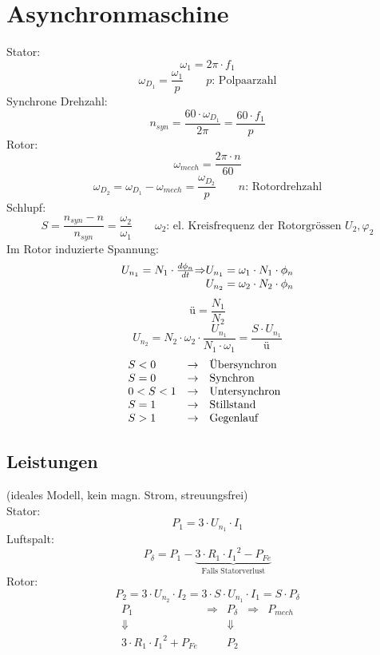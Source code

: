 \section{Asynchronmaschine}
Stator: 
\[ \omega_1 = 2 \pi \cdot f_1 \]
\[ \omega_{D_1} = \frac{\omega_1}{p} \qquad p\text{: Polpaarzahl} \]
Synchrone Drehzahl: 
\[ n_{syn} = \frac{60 \cdot \omega_{D_1}}{2 \pi} = \frac{60 \cdot f_1}{p} \]
Rotor: 
\[ \omega_{mech} = \frac{2 \pi \cdot n}{60} \]
\[ \omega_{D_2} = \omega_{D_1} - \omega_{mech} = \frac{\omega_{D_2}}{p} 
\qquad n\text{: Rotordrehzahl} \]
Schlupf: 
\[ S = \frac{n_{syn} - n}{n_{syn}} = \frac{\omega_2}{\omega_1} 
\qquad \text{$\omega_2$: el. Kreisfrequenz der Rotorgrössen $U_2, \varphi_2$} \]
Im Rotor induzierte Spannung: 
\[ \begin{array}{@{}l@{}l@{}l@{}}
U_{n_1} = N_1 \cdot \frac{d \phi_n}{d t} & \Rightarrow 
& U_{n_1} = \omega_1 \cdot N_1 \cdot \phi_n \\
&& U_{n_2} = \omega_2 \cdot N_2 \cdot \phi_n \\
\end{array} \]
\[ ü = \frac{N_1}{N_2} \]
\[ U_{n_2} = N_2 \cdot \omega_2 \cdot \frac{U_{n_1}}{N_1 \cdot \omega_1} 
= \frac{S \cdot U_{n_1}}{ü} \]
\[ \begin{array}{@{}lll}
S < 0     & \rightarrow & \text{Übersynchron} \\
S = 0     & \rightarrow & \text{Synchron} \\
0 < S < 1 & \rightarrow & \text{Untersynchron} \\
S = 1     & \rightarrow & \text{Stillstand} \\
S > 1     & \rightarrow & \text{Gegenlauf} \\
\end{array} \]

\subsection{Leistungen}
(ideales Modell, kein magn. Strom, streuungsfrei)\\
Stator: 
\[ P_1 = 3 \cdot U_{n_1} \cdot I_1 \]
Luftspalt: 
\[ P_\delta = P_1 - \underbrace{3 \cdot R_1 \cdot {I_1}^2 - P_{Fe}}_
{\text{Falls Statorverlust}} \]
Rotor: 
\[ P_2 = 3 \cdot U_{n_2} \cdot I_2 
= 3 \cdot S \cdot U_{n_1} \cdot I_1 = S \cdot P_\delta \]
\[ \begin{array}{ccccc}
P_1 & \Rightarrow &  P_\delta & \Rightarrow & P_{mech} \\
\Downarrow & & \Downarrow & & \\
3 \cdot R_1 \cdot {I_1}^2 + P_{Fe} & & P_2 & \\
\end{array} \]

